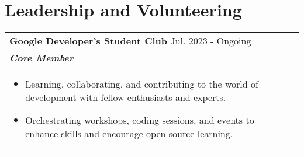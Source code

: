 \documentclass[a4paper,8pt]{article}
\begin{document}
\color[HTML]{318CE7}\section{\textbf{Leadership and Volunteering}}
\begin{tabularx}{\linewidth}{ @{}l r@{} }
\color[HTML]{1C033C} \textbf{Google Developer's Student Club} \hfill \color[HTML]{1C033C} Jul. 2023 - Ongoing \\[5pt]
\color[HTML]{1C033C}\textbf{\textit{Core Member}} \\[5pt]
\begin{minipage}[t]{\linewidth}
    \begin{itemize}[nosep,after=\strut, leftmargin=2em, itemsep=2pt]
        \color[HTML]{1C033C}\item Learning, collaborating, and contributing to the world of development with fellow enthusiasts and experts.
       \color[HTML]{1C033C} \item Orchestrating workshops, coding sessions, and events to enhance skills and encourage open-source learning.
    \end{itemize}
\end{minipage}\end{tabularx}
\end{document}
